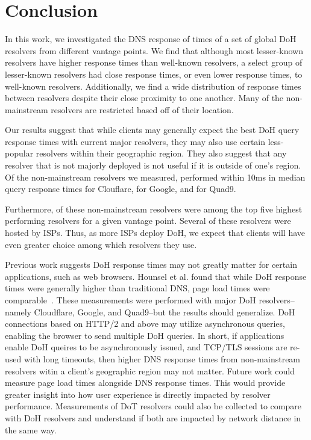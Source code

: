 \section{Conclusion}\label{sec:conclusion}

In this work, we investigated the DNS response of times of a set of global DoH
resolvers from different vantage points.  We find that although most
lesser-known resolvers have higher response times than well-known resolvers, a
select group of lesser-known resolvers had close response times, or even lower
response times, to well-known resolvers.  Additionally, we find a wide
distribution of response times between resolvers despite their close proximity
to one another.  Many of the non-mainstream resolvers are restricted based off
of their location.  

Our results suggest that while clients may generally expect the best DoH query response times with current major resolvers, they may also use certain less-popular resolvers within their geographic region.
They also suggest that any resolver that is not majorly deployed is not useful if it is outside of one's region.
Of the  non-mainstream resolvers we measured,  performed within 10ms in median query response times for Clouflare,  for Google, and  for Quad9.

Furthermore,  of these non-mainstream resolvers were among the top five highest performing resolvers for a given vantage point.
Several of these resolvers were hosted by ISPs.
Thus, as more ISPs deploy DoH, we expect that clients will have even greater choice among which resolvers they use.

Previous work suggests DoH response times may not greatly matter for certain applications, such as web browsers.
Hounsel et al. found that while DoH response times were generally higher than traditional DNS, page load times were comparable~\cite{hounsel2020comparing}.
These measurements were performed with major DoH resolvers--namely Cloudflare, Google, and Quad9--but the results should generalize.
DoH connections based on HTTP/2 and above may utilize asynchronous queries, enabling the browser to send multiple DoH queries.
In short, if applications enable DoH queires to be asynchronously issued, and TCP/TLS sessions are re-used with long timeouts, then higher DNS response times from non-mainstream resolvers witin a client's geographic region may not matter.
Future work could measure page load times alongside DNS response times.  This
would provide greater insight into how user experience is directly impacted by
resolver performance.  Measurements of DoT resolvers could also be collected
to compare with DoH resolvers and understand if both are impacted by network
distance in the same way. 
